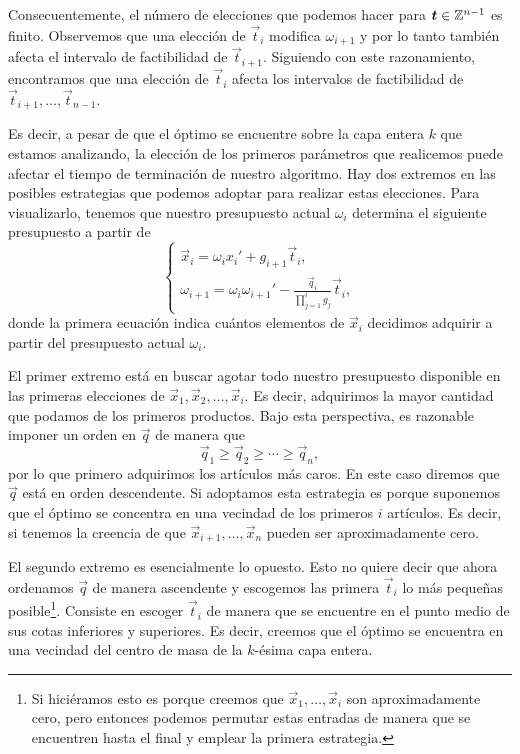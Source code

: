 Consecuentemente, el número de elecciones que podemos hacer para $\boldsymbol{t} \in \mathbb{Z}^{n-1}$ es finito.
Observemos que una elección de $\vec{t}_i$ modifica $\omega_{i+1}$ y por lo tanto también afecta el
intervalo de factibilidad de $\vec{t}_{i+1}$. Siguiendo con este razonamiento, encontramos que una
elección de $\vec{t}_i$ afecta los intervalos de factibilidad de $\vec{t}_{i+1}, \ldots,
\vec{t}_{n-1}$.

Es decir, a pesar de que el óptimo se encuentre sobre la capa entera $k$ que estamos analizando, la
elección de los primeros parámetros que realicemos puede afectar el tiempo de terminación de nuestro
algoritmo. Hay dos extremos en las posibles estrategias que podemos adoptar para realizar estas
elecciones. Para visualizarlo, tenemos que nuestro presupuesto actual $\omega_{i}$ determina el
siguiente presupuesto a partir de
\begin{equation*}
	\begin{cases}
		\vec{x}_i = \omega_ix_i' + g_{i+1}\vec{t}_i, \\
		\omega_{i+1} = \omega_i\omega_{i+1}' - \frac{\vec{q}_i}{\prod_{j=1}^{i}g_j}\vec{t}_i,
	\end{cases}
\end{equation*}
donde la primera ecuación indica cuántos elementos de $\vec{x}_i$ decidimos adquirir a partir del
presupuesto actual $\omega_i$.

El primer extremo está en buscar agotar todo nuestro presupuesto disponible en las primeras
elecciones de $\vec{x}_1, \vec{x}_2, \ldots, \vec{x}_i$. Es decir, adquirimos la mayor cantidad que
podamos de los primeros productos. Bajo esta perspectiva, es razonable imponer un orden en $\vec{q}$
de manera que
\begin{equation*}
	\vec{q}_1 \geq \vec{q}_2 \geq \cdots \geq \vec{q}_n,
\end{equation*}
por lo que primero adquirimos los artículos más caros. En este caso diremos que $\vec{q}$ está en
orden descendente. Si adoptamos esta estrategia es porque suponemos que el óptimo se concentra en
una vecindad de los primeros $i$ artículos. Es decir, si tenemos la creencia de que $\vec{x}_{i +
1}, \ldots, \vec{x}_n$ pueden ser aproximadamente cero.


El segundo extremo es esencialmente lo opuesto. Esto no quiere decir que ahora ordenamos $\vec{q}$
de manera ascendente y escogemos las primera $\vec{t}_i$ lo más pequeñas posible\footnote{Si
	hiciéramos esto es porque creemos que $\vec{x}_1, \ldots, \vec{x}_i$ son aproximadamente cero,
	pero entonces podemos permutar estas entradas de manera que se encuentren hasta el final y
emplear la primera estrategia.}. Consiste en escoger $\vec{t}_i$ de manera que se encuentre en el
punto medio de sus cotas inferiores y superiores. Es decir, creemos que el óptimo se encuentra en
una vecindad del centro de masa de la $k$-ésima capa entera.

